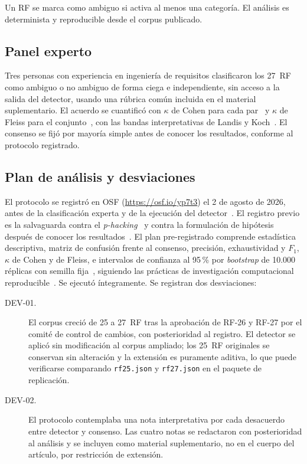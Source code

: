 \documentclass[runningheads]{llncs}
\begin{document}
Un RF se marca como ambiguo si activa al menos una categoría. El análisis es
determinista y reproducible desde el corpus publicado.

\subsection{Panel experto}

Tres personas con experiencia en ingeniería de requisitos clasificaron los
27~RF como ambiguo o no ambiguo de forma ciega e independiente, sin acceso a la
salida del detector, usando una rúbrica común incluida en el material
suplementario. El acuerdo se cuantificó con $\kappa$ de Cohen para cada
par~\cite{cohen1960} y $\kappa$ de Fleiss para el conjunto~\cite{fleiss1971},
con las bandas interpretativas de Landis y Koch~\cite{landis1977}. El consenso
se fijó por mayoría simple antes de conocer los resultados, conforme al
protocolo registrado.

\subsection{Plan de análisis y desviaciones}

El protocolo se registró en OSF (\url{https://osf.io/yp7t3}) el 2 de agosto de
2026, antes de la clasificación experta y de la ejecución del
detector~\cite{nosek2018prereg}. El registro previo es la salvaguarda contra el
\textit{p-hacking}~\cite{simmons2011false} y contra la formulación de hipótesis
después de conocer los resultados~\cite{kerr1998harking}. El plan pre-registrado comprende estadística
descriptiva, matriz de confusión frente al consenso, precisión, exhaustividad y
$F_1$, $\kappa$ de Cohen y de Fleiss, e intervalos de confianza al 95\,\% por
\textit{bootstrap} de 10.000 réplicas con semilla fija~\cite{efron1994},
siguiendo las prácticas de investigación computacional
reproducible~\cite{sandve2013ten,peng2011reproducible}.
Se ejecutó íntegramente. Se registran dos desviaciones:

\begin{description}
\item[DEV-01.] El corpus creció de 25 a 27~RF tras la aprobación de RF-26 y
RF-27 por el comité de control de cambios, con posterioridad al registro. El
detector se aplicó sin modificación al corpus ampliado; los 25~RF originales se
conservan sin alteración y la extensión es puramente aditiva, lo que puede
verificarse comparando \texttt{rf25.json} y \texttt{rf27.json} en el paquete
de replicación.
\item[DEV-02.] El protocolo contemplaba una nota interpretativa por cada
desacuerdo entre detector y consenso. Las cuatro notas se redactaron con
posterioridad al análisis y se incluyen como material suplementario, no en el
cuerpo del artículo, por restricción de extensión.
\end{description}
\end{document}
